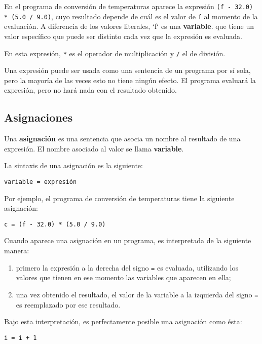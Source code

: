 En el programa de conversión de temperaturas aparece la expresión
\lstinline!(f - 32.0) * (5.0 / 9.0)!, cuyo resultado depende de cuál es
el valor de \lstinline!f! al momento de la evaluación. A diferencia de
los valores literales, `f` es una \textbf{variable}. que tiene un valor
específico que puede ser distinto cada vez que la expresión es evaluada.

En esta expresión, \lstinline!*! es el operador de multiplicación y
\lstinline!/! el de división.

Una expresión puede ser usada como una sentencia de un programa por sí
sola, pero la mayoría de las veces esto no tiene ningún efecto. El
programa evaluará la expresión, pero no hará nada con el resultado
obtenido.

\subsection{Asignaciones}

Una \textbf{asignación} es una sentencia que asocia un nombre al
resultado de una expresión. El nombre asociado al valor se llama
\textbf{variable}.

La sintaxis de una asignación es la siguiente:

\begin{lstlisting}
variable = expresión
\end{lstlisting}

Por ejemplo, el programa de conversión de temperaturas tiene la
siguiente asignación:

\begin{lstlisting}
c = (f - 32.0) * (5.0 / 9.0)
\end{lstlisting}

Cuando aparece una asignación en un programa, es interpretada de la
siguiente manera:

\begin{enumerate}
\item
  primero la expresión a la derecha del signo \lstinline!=! es evaluada,
  utilizando los valores que tienen en ese momento las variables que
  aparecen en ella;
\item
  una vez obtenido el resultado, el valor de la variable a la izquierda
  del signo \lstinline!=! es reemplazado por ese resultado.
\end{enumerate}

Bajo esta interpretación, es perfectamente posible una asignación como
ésta:

\begin{lstlisting}
i = i + 1
\end{lstlisting}

